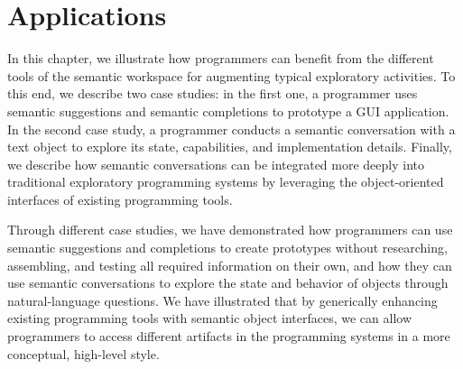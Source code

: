 
\chapter{Applications}
\label{cha:application}

In this chapter, we illustrate how programmers can benefit from the different tools of the semantic workspace for augmenting typical exploratory activities.
To this end, we describe two case studies: in the first one, a programmer uses semantic suggestions and semantic completions to prototype a GUI application.
In the second case study, a programmer conducts a semantic conversation with a text object to explore its state, capabilities, and implementation details.
Finally, we describe how semantic conversations can be integrated more deeply into traditional exploratory programming systems by leveraging the object-oriented interfaces of existing programming tools.

\pagebreak
{}

\begin{summary}
	Through different case studies, we have demonstrated how programmers can use semantic suggestions and completions to create prototypes without researching, assembling, and testing all required information on their own, and how they can use semantic conversations to explore the state and behavior of objects through natural-language questions.
	We have illustrated that by generically enhancing existing programming tools with semantic object interfaces, we can allow programmers to access different artifacts in the programming systems in a more conceptual, high-level style.
\end{summary}
